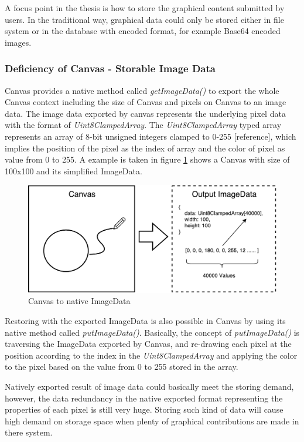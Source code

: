 A focus point in the thesis is how to store the graphical content submitted by users. In the traditional way, graphical data could only be stored either in file system or in the database with encoded format, for example Base64 encoded images. 

\subsubsection{Deficiency of Canvas - Storable Image Data}
Canvas provides a native method called \textit{getImageData()} to export the whole Canvas context including the size of Canvas and pixels on Canvas to an image data. The image data exported by canvas represents the underlying pixel data with the format of \textit{Uint8ClampedArray}. The \textit{Uint8ClampedArray} typed array represents an array of 8-bit unsigned integers clamped to 0-255 [reference], which implies the position of the pixel as the index of array and the color of pixel as value from 0 to 255. A example is taken in figure \ref{fig:canvas-imagedata} shows a Canvas with size of 100x100 and its simplified ImageData. 

\begin{figure}[!htbp]
  \centering
    \includegraphics[width=1\textwidth]{Figures/concept-canvas-imagedata.pdf}
  \caption{Canvas to native ImageData}
  \label{fig:canvas-imagedata}
\end{figure}

Restoring with the exported ImageData is also possible in Canvas by using its native method called \textit{putImageData()}. Basically, the concept of \textit{putImageData()} is traversing the ImageData exported by Canvas, and re-drawing each pixel at the position according to the index in the \textit{Uint8ClampedArray} and applying the color to the pixel based on the value from 0 to 255 stored in the array.

Natively exported result of image data could basically meet the storing demand, however, the data redundancy in the native exported format representing the properties of each pixel is still very huge. Storing such kind of data will cause high demand on storage space when plenty of graphical contributions are made in there system.

